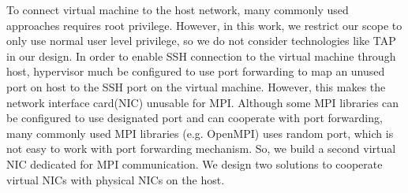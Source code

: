 To connect virtual machine to the host network, many commonly used approaches requires root privilege. However, in this work, we restrict our scope to only use normal user level privilege, so we do not consider technologies like TAP in our design. In order to enable SSH connection to the virtual machine through host, hypervisor much be configured to use port forwarding to map an unused port on host to the SSH port on the virtual machine. However, this makes the network interface card(NIC) unusable for MPI. Although some MPI libraries can be configured to use designated port and can cooperate with port forwarding, many commonly used MPI libraries (e.g. OpenMPI) uses random port, which is not easy to work with port forwarding mechanism. So, we build a second virtual NIC dedicated for MPI communication. We design two solutions to cooperate virtual NICs with physical NICs on the host. 

 
